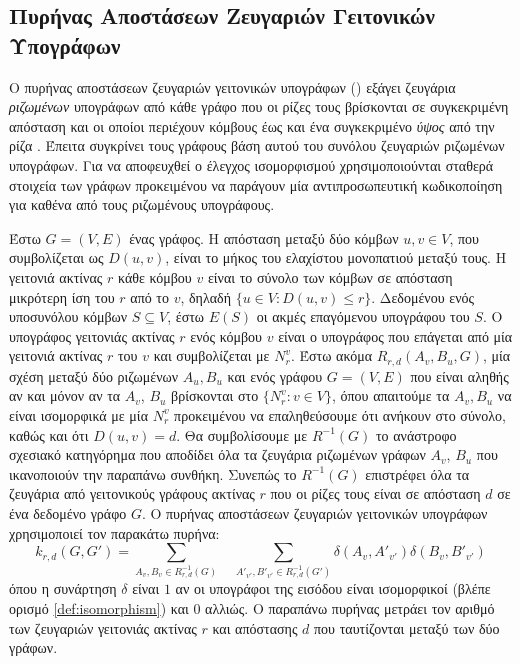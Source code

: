 \subsection{Πυρήνας Αποστάσεων Ζευγαριών Γειτονικών Υπογράφων}
\label{ssec:nspdk}
Ο πυρήνας αποστάσεων ζευγαριών γειτονικών υπογράφων () εξάγει ζευγάρια \textit{ριζωμένων} υπογράφων από κάθε γράφο που οι ρίζες τους βρίσκονται σε συγκεκριμένη απόσταση και οι οποίοι περιέχουν κόμβους έως και ένα συγκεκριμένο \textit{ύψος} από την ρίζα \cite{costa2010fast}.
Έπειτα συγκρίνει τους γράφους βάση αυτού του συνόλου ζευγαριών ριζωμένων υπογράφων.
Για να αποφευχθεί ο έλεγχος ισομορφισμού χρησιμοποιούνται σταθερά στοιχεία των γράφων προκειμένου να παράγουν μία αντιπροσωπευτική κωδικοποίηση για καθένα από τους ριζωμένους υπογράφους.\par
Έστω $G=(V,E)$ ένας γράφος.
Η απόσταση μεταξύ δύο κόμβων $u,v \in V$, που συμβολίζεται ως $D(u,v)$, είναι το μήκος του ελαχίστου μονοπατιού μεταξύ τους.
Η γειτονιά ακτίνας $r$ κάθε κόμβου $v$ είναι το σύνολο των κόμβων σε απόσταση μικρότερη ίση του $r$ από το $v$, δηλαδή $\{ u \in V : D(u,v) \leq r\}$.
Δεδομένου ενός υποσυνόλου κόμβων $S \subseteq V$, έστω $E(S)$ οι ακμές επαγόμενου υπογράφου του $S$.
Ο υπογράφος γειτονιάς ακτίνας $r$ ενός κόμβου $v$ είναι ο υπογράφος που επάγεται από μία γειτονιά ακτίνας $r$ του $v$ και συμβολίζεται με $N_r^v$.
Έστω ακόμα $R_{r,d}(A_v,B_u,G)$, μία σχέση μεταξύ δύο ριζωμένων $A_{u}, B_{u}$ και ενός γράφου $G=(V,E)$ που είναι αληθής αν και μόνον αν τα $A_v$, $B_u$ βρίσκονται στο $\{N_r^v : v \in V \}$, όπου απαιτούμε τα $A_v, B_u$ να είναι ισομορφικά με μία $N_r^v$ προκειμένου να επαληθεύσουμε ότι ανήκουν στο σύνολο, καθώς και ότι $D(u,v) = d$.
Θα συμβολίσουμε με $R^{-1}(G)$ το ανάστροφο σχεσιακό κατηγόρημα που αποδίδει όλα τα ζευγάρια ριζωμένων γράφων $A_v$, $B_u$ που ικανοποιούν την παραπάνω συνθήκη.
Συνεπώς το $R^{-1}(G)$ επιστρέφει όλα τα ζευγάρια από γειτονικούς γράφους ακτίνας $r$ που οι ρίζες τους είναι σε απόσταση $d$ σε ένα δεδομένο γράφο $G$.
Ο πυρήνας αποστάσεων ζευγαριών γειτονικών υπογράφων χρησιμοποιεί τον παρακάτω πυρήνα:
\begin{equation}
    k_{r,d}(G, G') = \sum_{A_v, B_v \in R_{r,d}^{-1}(G)} \quad \sum_{A'_{v'}, B'_{v'} \in R_{r,d}^{-1}(G')} \delta(A_v, A'_{v'}) \delta(B_v, B'_{v'})
\end{equation}
όπου η συνάρτηση $\delta$ είναι $1$ αν οι υπογράφοι της εισόδου είναι ισομορφικοί (βλέπε ορισμό \ref{def:isomorphism}) και $0$ αλλιώς.
Ο παραπάνω πυρήνας μετράει τον αριθμό των ζευγαριών γειτονιάς ακτίνας $r$ και απόστασης $d$ που ταυτίζονται μεταξύ των δύο γράφων.
